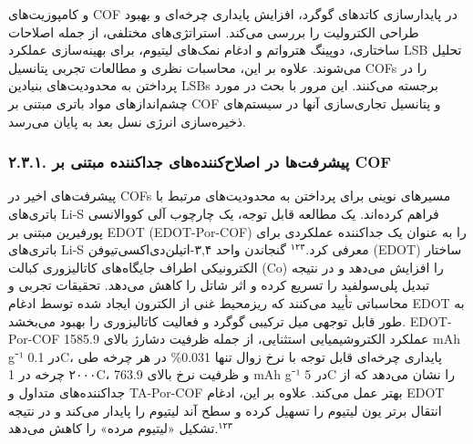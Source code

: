 \documentclass[12pt,a4paper,twocolumn]{article} %
\newcommand{\persian}[1]{\textfarsi{#1}}
\newcommand{\english}[1]{\textenglish{#1}}
\begin{document}

\persian{
و کامپوزیت‌های \english{COF} در پایدارسازی کاتدهای گوگرد، افزایش پایداری چرخه‌ای و بهبود طراحی الکترولیت را بررسی می‌کند. استراتژی‌های مختلفی، از جمله اصلاحات ساختاری، دوپینگ هترواتم و ادغام نمک‌های لیتیوم، برای بهینه‌سازی عملکرد \english{LSB} تحلیل می‌شوند. علاوه بر این، محاسبات نظری و مطالعات تجربی پتانسیل \english{COFs} را در پرداختن به محدودیت‌های بنیادین \english{LSBs} برجسته می‌کنند. این مرور با بحث در مورد چشم‌اندازهای مواد باتری مبتنی بر \english{COF} و پتانسیل تجاری‌سازی آنها در سیستم‌های ذخیره‌سازی انرژی نسل بعد به پایان می‌رسد.
}
\subsubsection*{\persian{۲.۳.۱. پیشرفت‌ها در اصلاح‌کننده‌های جداکننده مبتنی بر \english{COF}}}
\persian{
پیشرفت‌های اخیر در \english{COFs} مسیرهای نوینی برای پرداختن به محدودیت‌های مرتبط با باتری‌های \english{Li-S} فراهم کرده‌اند. یک مطالعه قابل توجه، یک چارچوب آلی کووالانسی پورفیرین مبتنی بر \english{EDOT} (\english{EDOT-Por-COF}) را به عنوان یک جداکننده عملکردی برای باتری‌های \english{Li-S} معرفی کرد.$^{۱۲۳}$ گنجاندن واحد ۳,۴-اتیلن‌دی‌اکسی‌تیوفن (\english{EDOT}) ساختار الکترونیکی اطراف جایگاه‌های کاتالیزوری کبالت (\english{Co}) را افزایش می‌دهد و در نتیجه تبدیل پلی‌سولفید را تسریع کرده و اثر شاتل را کاهش می‌دهد. تحقیقات تجربی و محاسباتی تأیید می‌کنند که ریزمحیط غنی از الکترون ایجاد شده توسط ادغام \english{EDOT} به طور قابل توجهی میل ترکیبی گوگرد و فعالیت کاتالیزوری را بهبود می‌بخشد. \english{EDOT-Por-COF} عملکرد الکتروشیمیایی استثنایی، از جمله ظرفیت دشارژ بالای \english{1585.9 mAh g⁻¹} در \english{0.1C}، پایداری چرخه‌ای قابل توجه با نرخ زوال تنها \english{0.031\%} در هر چرخه طی ۲۰۰۰ چرخه در \english{1C}، و ظرفیت نرخ بالای \english{763.9 mAh g⁻¹} در \english{5C} را نشان می‌دهد که از جداکننده‌های متداول و \english{TA-Por-COF} بهتر عمل می‌کند. علاوه بر این، ادغام \english{EDOT} انتقال برتر یون لیتیوم را تسهیل کرده و سطح آند لیتیوم را پایدار می‌کند و در نتیجه تشکیل «لیتیوم مرده» را کاهش می‌دهد.$^{۱۲۳}$
}
\end{document}
